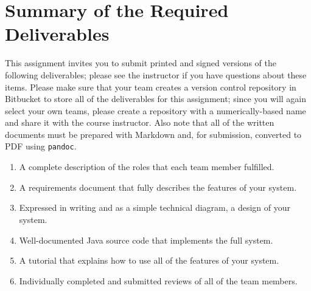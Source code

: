 \section*{Summary of the Required Deliverables}

This assignment invites you to submit printed and signed versions of the following deliverables; please see the
instructor if you have questions about these items. Please make sure that your team creates a version control repository
in Bitbucket to store all of the deliverables for this assignment; since you will again select your own teams, please
create a repository with a numerically-based name and share it with the course instructor. Also note that all of the
written documents must be prepared with Markdown and, for submission, converted to PDF using {\tt pandoc}.

\vspace*{-.1in}
\begin{enumerate}
  \setlength{\itemsep}{0in}
  \item A complete description of the roles that each team member fulfilled.
  \item A requirements document that fully describes the features of your system.
  \item Expressed in writing and as a simple technical diagram, a design of your system.
  \item Well-documented Java source code that implements the full system.
  \item A tutorial that explains how to use all of the features of your system.
  \item Individually completed and submitted reviews of all of the team members.
\end{enumerate}
\vspace*{-.1in}


